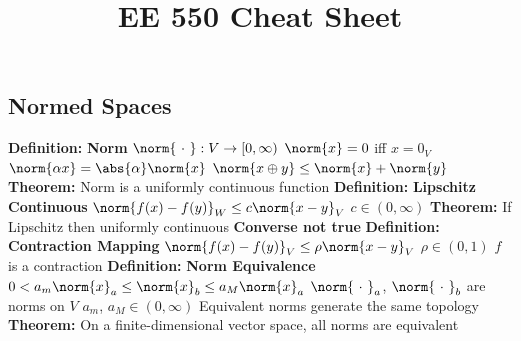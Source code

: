 \documentclass[14pt]{extarticle}
\title{EE 550 Cheat Sheet}
\def\Definition{{\color{blue} \textbf{Definition:} }}
\def\Theorem{{\color{red} \textbf{Theorem:} }}
\begin{document}
	\maketitle	
	\begin{outline}	
	\section*{Normed Spaces}	
		\1 \Definition \textbf{Norm}
			\2	$\norm{~\cdot~} : V \rightarrow [0,\infty)$
			\2	$\norm{x} = 0$ iff $x = 0_V$
			\2	$\norm{\alpha x} = \abs{\alpha} \norm{x}$
			\2	$\norm{x \oplus y} \le \norm{x} + \norm{y}$
		\1	\Theorem Norm is a uniformly continuous function
		\1	\Definition \textbf{Lipschitz Continuous}
			\2	$\norm{f(x) - f(y)}_W \le c\norm{x-y}_V$
				\3	$c \in (0,\infty)$ 
		\1	\Theorem If Lipschitz then uniformly continuous
			\2	\textbf{Converse not true}
		\1	\Definition \textbf{Contraction Mapping}
			\2	$\norm{f(x) - f(y)}_V \le \rho\norm{x - y}_V$
				\3	$\rho \in (0,1)$
			\2	$f$ is a contraction
		\1	\Definition \textbf{Norm Equivalence}
			\2	$0 < a_m\norm{x}_a \le \norm{x}_b \le a_M \norm{x}_a$
				\3	$\norm{~\cdot~}_a$, $\norm{~\cdot~}_b$ are norms on $V$
				\3	$a_m$, $a_M \in (0,\infty)$
			\2	Equivalent norms generate the same topology
		\1	\Theorem On a finite-dimensional vector space, all norms are equivalent

\end{outline}
\end{document}
